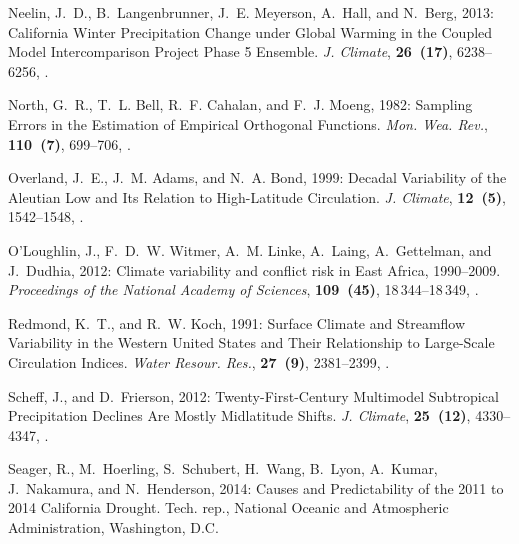 \documentclass[final, double]{ua-thesis}
\begin{document}
\begin{thebibliography}{}
Neelin, J.~D., B.~Langenbrunner, J.~E. Meyerson, A.~Hall, and N.~Berg, 2013:
  California {Winter} {Precipitation} {Change} under {Global} {Warming} in the
  {Coupled} {Model} {Intercomparison} {Project} {Phase} 5 {Ensemble}.
  \textit{J. Climate}, \textbf{26~(17)}, 6238--6256,
  .

North, G.~R., T.~L. Bell, R.~F. Cahalan, and F.~J. Moeng, 1982: Sampling
  {Errors} in the {Estimation} of {Empirical} {Orthogonal} {Functions}.
  \textit{Mon. Wea. Rev.}, \textbf{110~(7)}, 699--706,
  .

Overland, J.~E., J.~M. Adams, and N.~A. Bond, 1999: Decadal {Variability} of
  the {Aleutian} {Low} and {Its} {Relation} to {High}-{Latitude} {Circulation}.
  \textit{J. Climate}, \textbf{12~(5)}, 1542--1548,
  .

O’Loughlin, J., F.~D.~W. Witmer, A.~M. Linke, A.~Laing, A.~Gettelman, and
  J.~Dudhia, 2012: Climate variability and conflict risk in {East} {Africa},
  1990–2009. \textit{Proceedings of the National Academy of Sciences},
  \textbf{109~(45)}, 18\,344--18\,349, .

Redmond, K.~T., and R.~W. Koch, 1991: Surface {Climate} and {Streamflow}
  {Variability} in the {Western} {United} {States} and {Their} {Relationship}
  to {Large}-{Scale} {Circulation} {Indices}. \textit{Water Resour. Res.},
  \textbf{27~(9)}, 2381--2399, .

Scheff, J., and D.~Frierson, 2012: Twenty-{First}-{Century} {Multimodel}
  {Subtropical} {Precipitation} {Declines} {Are} {Mostly} {Midlatitude}
  {Shifts}. \textit{J. Climate}, \textbf{25~(12)}, 4330--4347,
  .

Seager, R., M.~Hoerling, S.~Schubert, H.~Wang, B.~Lyon, A.~Kumar, J.~Nakamura,
  and N.~Henderson, 2014: Causes and {Predictability} of the 2011 to 2014
  {California} {Drought}. Tech. rep., National Oceanic and Atmospheric
  Administration, Washington, D.C.


\end{thebibliography}
\end{document}
